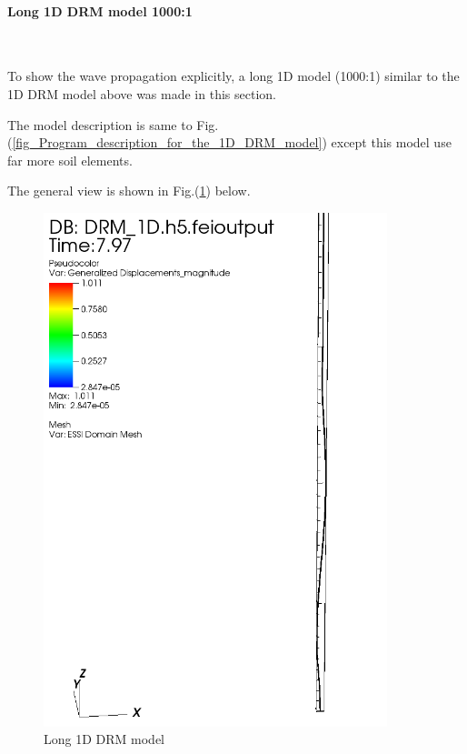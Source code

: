 \paragraph{Long 1D DRM model 1000:1 } ~

To show the wave propagation explicitly, a long 1D model (1000:1) similar to the
1D DRM model above was made in this section.

The           model           description           is          same          to
Fig.(\ref{fig_Program_description_for_the_1D_DRM_model})  except  this model use
far more soil elements.

The general view is shown in Fig.(\ref{fig_Long_1D_DRM_model}) below.

\begin{figure}[!htb]
  \centering
  \includegraphics[width=10cm]{./Figure-files/_Chapter_Appendix_Illustrative_Examples/long_DRM_full.png}
  \caption{Long 1D DRM model}
  \label{fig_Long_1D_DRM_model}
\end{figure}

